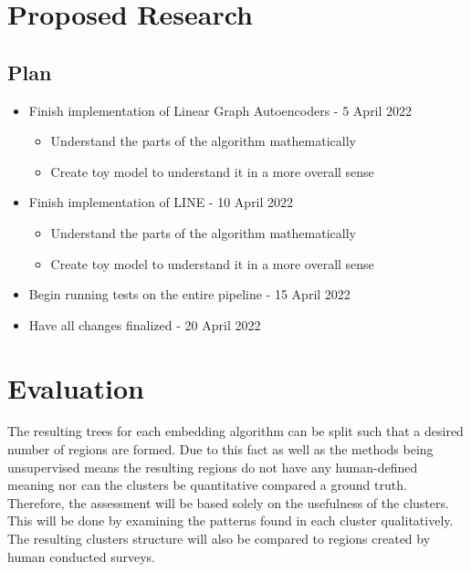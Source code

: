 \documentclass[conference]{IEEEtran}
\begin{document}
	\section{Proposed Research}
	\subsection{Plan}
	\begin{itemize}
		\item Finish implementation of Linear Graph Autoencoders - 5 April 2022
		\begin{itemize}
			\item Understand the parts of the algorithm mathematically
			\item Create toy model to understand it in a more overall sense
		\end{itemize}
		
		\item Finish implementation of LINE - 10 April 2022
		\begin{itemize}
			\item Understand the parts of the algorithm mathematically
			\item Create toy model to understand it in a more overall sense
		\end{itemize}
		
		\item Begin running tests on the entire pipeline - 15 April 2022
		\item Have all changes finalized - 20 April 2022
	\end{itemize}
	
	
	\section{Evaluation}
	The resulting trees for each embedding algorithm can be split such that a desired number of regions are formed. Due to this fact as well as the methods being unsupervised means the resulting regions do not have any human-defined meaning nor can the clusters be quantitative compared a ground truth. Therefore, the assessment will be based solely on the usefulness of the clusters. This will be done by examining the patterns found in each cluster qualitatively. The resulting clusters structure will also be compared to regions created by human conducted surveys.
	
\end{document}
